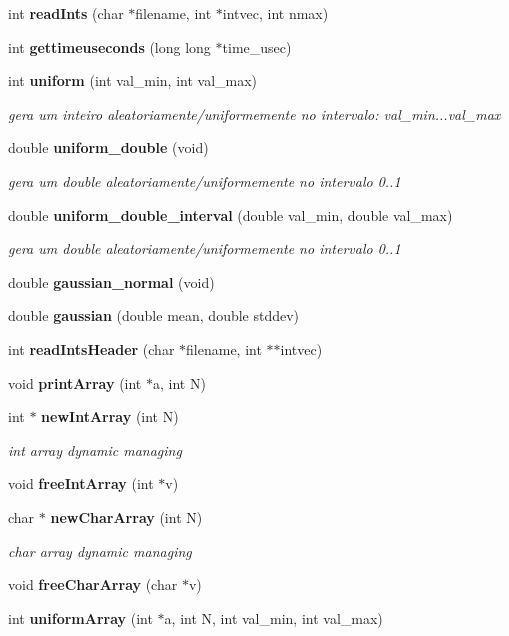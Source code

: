 \begin{DoxyCompactItemize}
\item 
int {\bf read\+Ints} (char $\ast$filename, int $\ast$intvec, int nmax)
\item 
int {\bf gettimeuseconds} (long long $\ast$time\+\_\+usec)
\item 
int {\bf uniform} (int val\+\_\+min, int val\+\_\+max)
\begin{DoxyCompactList}\small\item\em gera um inteiro aleatoriamente/uniformemente no intervalo\+: val\+\_\+min...val\+\_\+max \end{DoxyCompactList}\item 
double {\bf uniform\+\_\+double} (void)
\begin{DoxyCompactList}\small\item\em gera um double aleatoriamente/uniformemente no intervalo 0..1 \end{DoxyCompactList}\item 
double {\bf uniform\+\_\+double\+\_\+interval} (double val\+\_\+min, double val\+\_\+max)
\begin{DoxyCompactList}\small\item\em gera um double aleatoriamente/uniformemente no intervalo 0..1 \end{DoxyCompactList}\item 
double {\bf gaussian\+\_\+normal} (void)
\item 
double {\bf gaussian} (double mean, double stddev)
\item 
int {\bf read\+Ints\+Header} (char $\ast$filename, int $\ast$$\ast$intvec)
\item 
void {\bf print\+Array} (int $\ast$a, int N)
\item 
int $\ast$ {\bf new\+Int\+Array} (int N)
\begin{DoxyCompactList}\small\item\em int array dynamic managing \end{DoxyCompactList}\item 
void {\bf free\+Int\+Array} (int $\ast$v)
\item 
char $\ast$ {\bf new\+Char\+Array} (int N)
\begin{DoxyCompactList}\small\item\em char array dynamic managing \end{DoxyCompactList}\item 
void {\bf free\+Char\+Array} (char $\ast$v)
\item 
int {\bf uniform\+Array} (int $\ast$a, int N, int val\+\_\+min, int val\+\_\+max)
$$
\end{DoxyCompactItemize}
